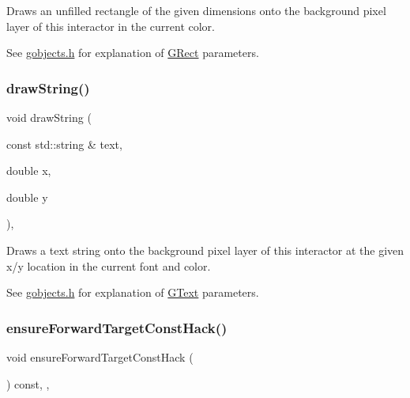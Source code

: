 Draws an unfilled rectangle of the given dimensions onto the background pixel layer of this interactor in the current color. 

See \mbox{\hyperlink{gobjects_8h_source}{gobjects.\+h}} for explanation of \mbox{\hyperlink{classGRect}{G\+Rect}} parameters. \mbox{\label{classGDrawingSurface_ad4e8551a753a77135792bbee97013675}} 
\subsubsection{\texorpdfstring{draw\+String()}{drawString()}}
{\footnotesize\ttfamily void draw\+String (\begin{DoxyParamCaption}\item[{const std\+::string \&}]{text,  }\item[{double}]{x,  }\item[{double}]{y }\end{DoxyParamCaption})\hspace{0.3cm}{\ttfamily [virtual]}, {\ttfamily [inherited]}}



Draws a text string onto the background pixel layer of this interactor at the given x/y location in the current font and color. 

See \mbox{\hyperlink{gobjects_8h_source}{gobjects.\+h}} for explanation of \mbox{\hyperlink{classGText}{G\+Text}} parameters. \mbox{\label{classGForwardDrawingSurface_a1b7188344977b67f01c452a6ba490992}} 
\subsubsection{\texorpdfstring{ensure\+Forward\+Target\+Const\+Hack()}{ensureForwardTargetConstHack()}}
{\footnotesize\ttfamily void ensure\+Forward\+Target\+Const\+Hack (\begin{DoxyParamCaption}{ }\end{DoxyParamCaption}) const\hspace{0.3cm}{\ttfamily [protected]}, {\ttfamily [virtual]}, {\ttfamily [inherited]}}

